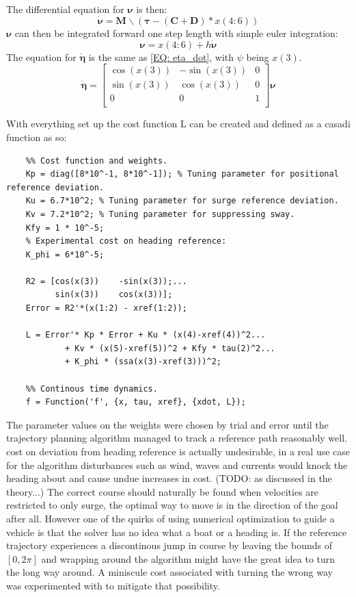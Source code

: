 The differential equation for $\bm{\nu}$ is then:
\begin{equation}
    \dot{\bm{\nu}} = \textbf{M}\backslash(\bm{\tau} - (\textbf{C}+\textbf{D})*x(4:6))
\end{equation}
$\bm{\nu}$ can then be integrated forward one step length with simple euler integration:
\begin{equation}
    \bm{\nu} = x(4:6) + h\dot{\bm{\nu}}
\end{equation}
The equation for $\dot{\bm{\eta}}$ is the same as \eqref{EQ: eta_dot}, with $\psi$ being $x(3)$.
\begin{equation}
    \dot{\bm{\eta}} = \begin{bmatrix}
        \cos(x(3)) & -\sin(x(3)) & 0\\
        \sin(x(3)) & \cos(x(3)) & 0\\
        0 & 0 & 1 \\
    \end{bmatrix} \bm{\nu}
\end{equation}

With everything set up the cost function L can be created and defined as a casadi function as so:
\begin{lstlisting}
    %% Cost function and weights.
    Kp = diag([8*10^-1, 8*10^-1]); % Tuning parameter for positional reference deviation.
    Ku = 6.7*10^2; % Tuning parameter for surge reference deviation.
    Kv = 7.2*10^2; % Tuning parameter for suppressing sway.
    Kfy = 1 * 10^-5;
    % Experimental cost on heading reference:
    K_phi = 6*10^-5;

    R2 = [cos(x(3))    -sin(x(3));...
          sin(x(3))    cos(x(3))];
    Error = R2'*(x(1:2) - xref(1:2));

    L = Error'* Kp * Error + Ku * (x(4)-xref(4))^2...
            + Kv * (x(5)-xref(5))^2 + Kfy * tau(2)^2...
            + K_phi * (ssa(x(3)-xref(3)))^2;
    
    %% Continous time dynamics.
    f = Function('f', {x, tau, xref}, {xdot, L});    
\end{lstlisting}

The parameter values on the weights were chosen by trial and error until the trajectory planning algorithm managed
to track a reference path reasonably well. cost on deviation from heading reference is actually undesirable, in a real use case
for the algorithm disturbances such as wind, waves and currents would knock the heading about and cause undue increases in cost.
(TODO: as discussed in the theory...) The correct course should naturally be found when velocities are restricted to only
surge, the optimal way to move is in the direction of the goal after all. However one of the quirks of using numerical optimization 
to guide a vehicle is that the solver has no idea what a boat or a heading is. If the reference trajectory experiences a discontinous
jump in course by leaving the bounds of $[0, 2\pi]$ and wrapping around the algorithm might have the great idea to turn the long way around.
A miniscule cost associated with turning the wrong way was experimented with to mitigate that possibility.

